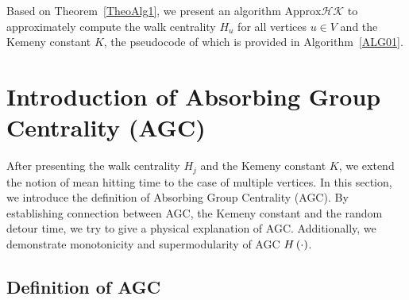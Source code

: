 \documentclass[10pt,journal,compsoc,twocolumn,twoside]{IEEEtran}
\begin{document}
Based on Theorem~\ref{TheoAlg1}, we  present an algorithm \(\text{Approx}\mathcal{HK}\) to approximately compute the walk centrality \(H_u\) for all  vertices  \(u \in V\) and the Kemeny constant \(K\), the pseudocode of which is provided in Algorithm~\ref{ALG01}.


\section{Introduction of Absorbing Group Centrality (AGC)}

After presenting the walk centrality \(H_j\) and the Kemeny constant \(K\), we extend the notion of mean hitting time to the case of multiple vertices.
In this section, we introduce the definition of Absorbing Group Centrality (AGC).
By establishing connection between AGC, the Kemeny constant and the random detour time, we try to give a physical explanation of AGC.
Additionally, we demonstrate monotonicity and supermodularity of AGC \(H\left(\cdot\right)\).

\subsection{Definition of AGC}
\end{document}
